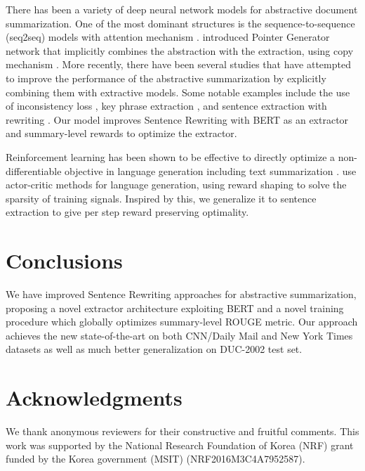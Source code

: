 \documentclass[11pt,a4paper]{article}
\begin{document}
There has been a variety of deep neural network models for
abstractive document summarization. One of the most dominant
structures is the sequence-to-sequence (seq2seq) models with attention mechanism 
\cite{rush-etal-2015-neural, chopra-etal-2016-abstractive, nallapati-etal-2016-abstractive}.
\citet{see-etal-2017-get} introduced Pointer Generator network
that implicitly combines the abstraction with the extraction,
using copy mechanism \cite{gu-etal-2016-incorporating, zeng2016efficient}.
More recently, there have been several studies that have attempted to improve
the performance of the abstractive summarization by explicitly combining them
with extractive models.
Some notable examples include the use of inconsistency loss \cite{hsu-etal-2018-unified},
key phrase extraction \cite{li-etal-2018-guiding, gehrmann-etal-2018-bottom}, and
sentence extraction with rewriting \cite{chen-bansal-2018-fast}.
Our model improves Sentence Rewriting with BERT as an extractor and summary-level rewards
to optimize the extractor.

Reinforcement learning has been shown to be effective to directly optimize
a non-differentiable objective in language generation including text summarization
\cite{DBLP:journals/corr/RanzatoCAZ15, DBLP:conf/iclr/BahdanauBXGLPCB17, paulus2018a, celikyilmaz-etal-2018-deep, narayan-etal-2018-ranking}.
\citet{DBLP:conf/iclr/BahdanauBXGLPCB17} use actor-critic methods
for language generation, using reward shaping \cite{Ng:1999:PIU:645528.657613}
to solve the sparsity of training signals. Inspired by this,
we generalize it to sentence extraction to give per step reward
preserving optimality.



\section{Conclusions}
We have improved Sentence Rewriting approaches for abstractive summarization,
proposing a novel extractor architecture exploiting BERT and a novel training
procedure which globally optimizes summary-level ROUGE metric.
Our approach achieves the new state-of-the-art on both CNN/Daily Mail and New York Times
datasets as well as much better generalization on DUC-2002 test set.

\section*{Acknowledgments}

We thank anonymous reviewers for their constructive and
fruitful comments.
This work was supported by the National
Research Foundation of Korea (NRF) grant funded by the
Korea government (MSIT) (NRF2016M3C4A7952587).
\end{document}

